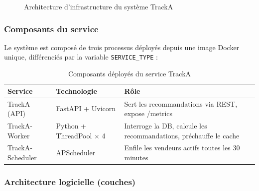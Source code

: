 \documentclass[12pt,a4paper,openany]{report}
\newcommand{\code}[1]{\texttt{#1}}
\begin{document}
\begin{figure}[H]
{
}
\caption{Architecture d'infrastructure du système TrackA}
\end{figure}

\subsubsection{Composants du service}

Le système est composé de trois processus déployés depuis une image Docker unique, différenciés par la variable \code{SERVICE\_TYPE} :

\begin{table}[H]
\centering
{}
\begin{tabularx}{\textwidth}{llX}
\toprule
\rowcolor{headerblue!20}
\textbf{Service} & \textbf{Technologie} & \textbf{Rôle} \\
\midrule
TrackA (API) & FastAPI + Uvicorn & Sert les recommandations via REST, expose /metrics \\
TrackA-Worker & Python + ThreadPool $\times$ 4 & Interroge la DB, calcule les recommandations, préchauffe le cache \\
TrackA-Scheduler & APScheduler & Enfile les vendeurs actifs toutes les 30 minutes \\
\bottomrule
\end{tabularx}
\caption{Composants déployés du service TrackA}
\end{table}

\subsubsection{Architecture logicielle (couches)}
\end{document}
